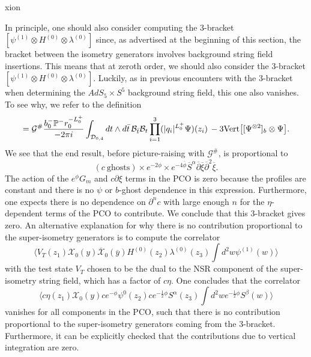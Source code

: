 xion\documentclass[12pt]{article}
\def\be{\begin{equation}}
\def\ee{\end{equation}}
\numberwithin{equation}{section}
\newcommand{\B}[1]{\overline{#1}}
\begin{document}
In principle, one should also consider computing the 3-bracket $[\psi^{(1)}\otimes H^{(0)}\otimes\lambda^{(0)}]$ since, as advertised at the beginning of this section, the bracket between the isometry generators involves background string field insertions. This means that at zeroth order, we should also consider the 3-bracket $[\psi^{(1)}\otimes H^{(0)}\otimes\lambda^{(0)}]$. Luckily, as in previous encounters with the 3-bracket when determining the $AdS_{5}\times S^{5}$ background string field, this one also vanishes. To see why, we refer to the definition
\be
	[\Psi^{\otimes 3}] = {\cal G^\#}{ b_0^-\mathbb{P}^- r_0^{-L_0^+} \over -2\pi i} \int_{{\cal D}_{0,4}} dt\wedge d\bar t \, {\cal B}_{\bar t} {\cal B}_t \prod_{i=1}^3 (|q_i|^{L_0^+} \Psi)(z_i) \, - 3 {\rm Vert} \big[[\Psi^{\otimes 2}]_b \otimes \Psi\big].
\ee
We see that the end result, before picture-raising with $\mathcal{G}^{\#}$, is proportional to
\be
	(c\ \mathrm{ghosts})\times e^{-2\phi}\times e^{-4\B{\phi}}\B{S}^{\alpha}\B{\partial}\B{\xi}\B{\partial}^{2}\B{\xi}.
\ee
The action of the $e^{\phi}G_{m}$ and $c\partial\xi$ terms in the PCO is zero because the profiles are constant and there is no $\psi$ or $b$-ghost dependence in this expression. Furthermore, one expects there is no dependence on $\partial^{n}c$ with large enough $n$ for the $\eta$-dependent terms of the PCO to contribute. We conclude that this 3-bracket gives zero. An alternative explanation for why there is no contribution proportional to the super-isometry generators is to compute the correlator
\be
	\langle V_{T}(z_{1})\mathcal{X}_{0}(y)\B{\mathcal{X}}_{0}(\B{y})H^{(0)}(z_{2})\lambda^{(0)}(z_{3})\int d^{2}w\psi^{(1)}(w) \rangle
\ee
with the test state $V_{T}$ chosen to be the dual to the NSR component of the super-isometry string field, which has a factor of $c\eta$. One concludes that the correlator
\be
	\langle c\eta(z_{1})\mathcal{X}_{0}(y)ce^{-\phi}\psi^{0}(z_{2})ce^{-\frac{1}{2}\phi}S^{\alpha}(z_{3})\int d^{2}we^{-\frac{1}{2}\phi}S^{\beta}(w) \rangle
\ee
vanishes for all components in the PCO, such that there is no contribution proportional to the super-isometry generators coming from the 3-bracket. Furthermore, it can be explicitly checked that the contributions due to vertical integration are zero.
\end{document}
